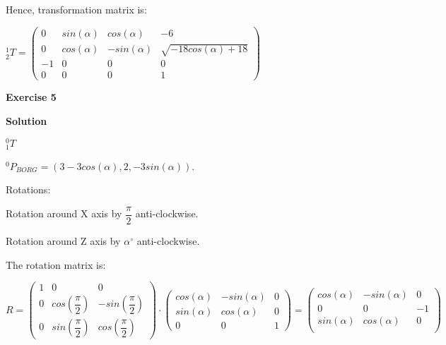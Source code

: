 \documentclass[12pt]{article}
\begin{document}
\begin{list}{)~}{}
Hence, transformation matrix is:

$_{2}^{1}T = \left(\begin{array}{cccc}
0 & sin\left(\alpha\right)& cos\left(\alpha\right) & -6\\
0 & cos\left(\alpha\right) & -sin\left(\alpha\right) & \sqrt{- 18 cos(\alpha) + 18} \\
-1 & 0 & 0 & 0 \\
0 & 0 & 0 & 1\end{array}\right)$

\end{list}

\newpage
\textbf{Exercise 5}		
		
\textbf{Solution}

\newpage

\begin{list}{)~}{}
\item
$_{1}^{0}T$

$^0 P_{BORG} = \left(3-3cos\left(\alpha\right), 2, -3sin\left(\alpha\right)\right)$.

Rotations:

\begin{list}{)~}{}
\item Rotation around X axis by $\dfrac{\pi}{2}$ anti-clockwise.
\item Rotation around Z axis by $\alpha^\circ$ anti-clockwise.
\end{list}

The rotation matrix is:

$R= 
\left(\begin{array}{ccc}
1 & 0 & 0\\
0 & cos\left(\dfrac{\pi}{2}\right) & -sin\left(\dfrac{\pi}{2}\right)\\
0 & sin\left(\dfrac{\pi}{2}\right) & cos\left(\dfrac{\pi}{2}\right)\end{array}\right)
\cdot 
\left(\begin{array}{ccc}
cos\left(\alpha\right) & -sin\left(\alpha\right) & 0 \\
sin\left(\alpha\right) & cos\left(\alpha\right) & 0\\
0 & 0 & 1\end{array}\right)
= 
\left(\begin{array}{ccc}
cos\left(\alpha\right) & -sin\left(\alpha\right) & 0 \\
0 &  0  & -1\\
sin\left(\alpha\right) & cos\left(\alpha\right) & 0\\ \end{array}\right)$


\end{list}
\end{document}
